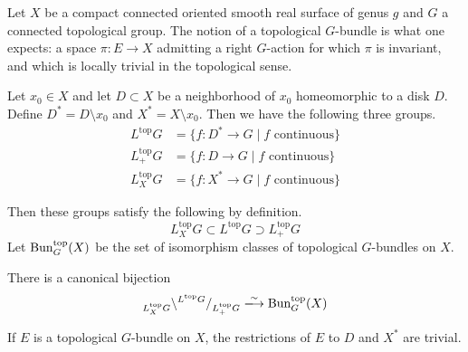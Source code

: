 \documentclass[12pt]{article}
\begin{document}
Let $X$ be a compact connected oriented smooth real surface of genus $g$
and $G$ a connected topological group. The notion of a topological $G$-bundle is what one expects: a space $\pi \colon E \to X$ admitting a right $G$-action for which $\pi$ is invariant, and which is locally trivial in the topological sense. 

\begin{defn}
    Let $x_0 \in X$ and let $D \subset X$ be a neighborhood of $x_0$ homeomorphic to a disk $D$. Define $D^* = D \setminus x_0$ and $X^* = X \setminus x_0$. Then we have the following three groups.
    \begin{align*}
        L^{\text{top}} G &= \{f \colon D^* \to G \mid f \text{ continuous}\} \\
        L^{\text{top}}_+ G &= \{f \colon D \to G \mid f \text{ continuous}\} \\
        L^{\text{top}}_X G &= \{f \colon X^* \to G \mid f \text{ continuous}\} 
    \end{align*}
\end{defn}

Then these groups satisfy the following by definition.
\[L^{\text{top}}_X G \subset L^{\text{top}} G \supset L^{\text{top}}_+ G\]
Let $\operatorname{Bun}^{\text{top}}_G(X)$ be the set of isomorphism classes of topological $G$-bundles on $X$.

\begin{prop}\label{topunif}
    There is a canonical bijection
    \[_{L^{\text{top}}_X G}\backslash^{L^{\text{top}} G}/_{L^{\text{top}}_+ G} \xlongrightarrow{\sim} \Bun^{\text{top}}_G(X)\]
\end{prop}

\begin{lem}\label{lemma1}
    If $E$ is a topological $G$-bundle on $X$, the restrictions of $E$ to $D$ and $X^*$ are trivial. 
\end{lem}
\end{document}
